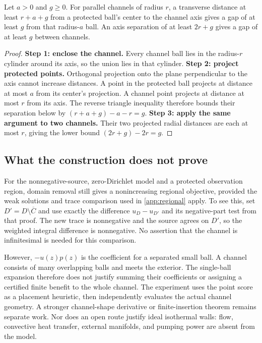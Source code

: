 \begin{proposition}
\label{prop:channelprotection}
Let $a>0$ and $g\geq0$. For parallel channels of radius $r$, a transverse distance at least
$r+a+g$ from a protected ball's center to the channel axis gives
a gap of at least $g$ from that radius-$a$ ball. An axis separation
of at least $2r+g$ gives a gap of at least $g$ between channels.
\end{proposition}
\begin{proof}
\textbf{Step 1: enclose the channel.}
Every channel ball lies in the radius-$r$ cylinder around its axis,
so the union lies in that cylinder.
\textbf{Step 2: project protected points.}
Orthogonal projection onto the plane perpendicular to the axis cannot
increase distances. A point in the protected ball projects at distance
at most $a$ from its center's projection. A channel point projects at
distance at most $r$ from its axis. The reverse triangle inequality
therefore bounds their separation below by $(r+a+g)-a-r=g$.
\textbf{Step 3: apply the same argument to two channels.}
Their two projected radial distances are each at most $r$, giving
the lower bound $(2r+g)-2r=g$.
\end{proof}

\subsection{What the construction does not prove}
For the nonnegative-source, zero-Dirichlet model and a protected
observation region, domain removal still gives a nonincreasing
regional objective, provided the weak solutions and trace comparison
used in \cref{app:regional} apply. To see this, set $D'=D\setminus
\overline C$ and use exactly the difference $u_D-u_{D'}$ and its
negative-part test from that proof. The new trace is nonnegative and
the source agrees on $D'$, so the weighted integral difference is
nonnegative. No assertion that the channel is infinitesimal is needed
for this comparison.

However, $-u(z)p(z)$ is the coefficient for a separated small ball.
A channel consists of many overlapping balls and meets the exterior.
The single-ball expansion therefore does not justify summing their
coefficients or assigning a certified finite benefit to the whole
channel. The experiment uses the point score as a placement heuristic,
then independently evaluates the actual channel geometry. A stronger
channel-shape derivative or finite-insertion theorem remains separate
work. Nor does an open route justify ideal isothermal walls: flow,
convective heat transfer, external manifolds, and pumping power are
absent from the model.

